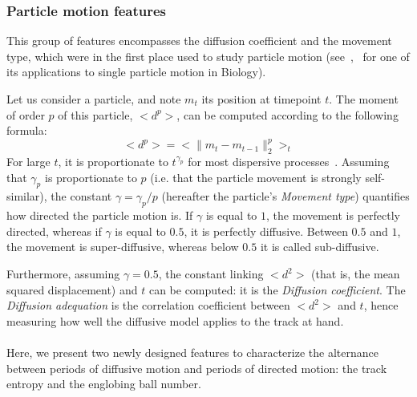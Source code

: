 \subsubsection{Particle motion features}
This group of features
encompasses the diffusion coefficient and the movement type, which
were in the first place used to study particle motion
(see~\cite{ferrari},~\cite{pmid16043363} for one of its applications to single particle motion in Biology).  

Let us consider a particle, and note $m_t$ its position at timepoint $t$. The moment of
order $p$ of this particle, $<d^p>$, can be computed according to the following formula: 
\[
<d^p>= < \|m_{t}-m_{t-1}\|_2^p >_t
\]
For large $t$, it is proportionate to $t^{\gamma_p}$ for
most dispersive processes~\cite{ferrari}. Assuming that $\gamma_p$ is
proportionate to $p$ (i.e. that the particle movement is strongly
self-similar), the constant $\gamma = \gamma_p /p$ (hereafter the particle's
\textit{Movement type}) quantifies how directed the particle motion is. If
$\gamma$ is equal to $1$, the movement is perfectly directed, whereas
if $\gamma$ is equal to $0.5$, it is perfectly diffusive. Between
$0.5$ and $1$, the movement is super-diffusive, whereas below $0.5$ it
is called sub-diffusive.  

Furthermore, assuming $ \gamma = 0.5 $, the constant linking $<d^2>$ (that is, the mean squared displacement) and $t$ can be computed: it is the \textit{Diffusion coefficient}. The \textit{Diffusion adequation} is the correlation coefficient between $<d^2>$ and $t$, hence measuring how well the diffusive model applies to the track at hand.
\paragraph*{}
Here, we present two newly designed features to characterize the
alternance between periods of diffusive motion and periods of directed
motion: the track entropy and the englobing ball number. 

